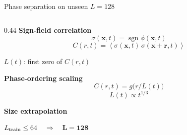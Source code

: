 \documentclass[11pt,UTF8]{beamer}
\begin{document}
\begin{frame}{Phase separation on unseen $L=128$}
  \begin{columns}[T]
    \begin{column}{0.44\textwidth}
      {\bfseries\color{Kleinblue} Sign-field correlation}
      \small
      \begin{equation*}
        \sigma(\bm{x},t)=\operatorname{sgn}\phi(\bm{x},t)
      \end{equation*}
      \begin{equation*}
        C(r,t)=\left\langle\sigma(\bm{x},t)\,\sigma(\bm{x}+\bm{r},t)\right\rangle
      \end{equation*}

      $L(t)$: first zero of $C(r,t)$

      {\bfseries\color{Kleinblue} Phase-ordering scaling}
      \begin{equation*}
        C(r,t)=g\big(r/L(t)\big)
      \end{equation*}
      \begin{equation*}
        L(t)\propto t^{1/3}
      \end{equation*}

      {\bfseries\color{Kleinblue} Size extrapolation}

      $L_{\rm train}\le64$\ \ {$\Longrightarrow$}\ \ \alert{$\bm{L=128}$}


\end{column}
\end{columns}
\end{frame}
\end{document}
